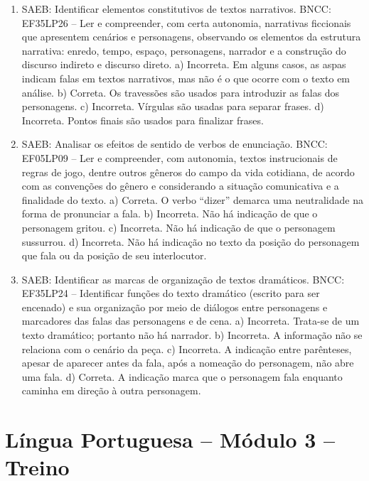 \begin{enumerate}
\item 
SAEB: Identificar elementos constitutivos de textos narrativos.
BNCC: EF35LP26 – Ler e compreender, com certa autonomia, narrativas ficcionais
que apresentem cenários e personagens, observando os elementos da
estrutura narrativa: enredo, tempo, espaço, personagens, narrador e a
construção do discurso indireto e discurso direto.
a) Incorreta. Em alguns casos, as aspas indicam falas em textos narrativos, mas não é o que ocorre com o texto em análise.
b) Correta. Os travessões são usados para introduzir as falas dos
personagens.
c) Incorreta. Vírgulas são usadas para separar frases.
d) Incorreta. Pontos finais são usados para finalizar frases.

\item
SAEB: Analisar os efeitos de sentido de verbos de enunciação.
BNCC: EF05LP09 – Ler e compreender, com autonomia, textos instrucionais de
regras de jogo, dentre outros gêneros do campo da vida cotidiana, de
acordo com as convenções do gênero e considerando a situação
comunicativa e a finalidade do texto.
a) Correta. O verbo “dizer” demarca uma neutralidade na forma de pronunciar a fala.
b) Incorreta. Não há indicação de que o personagem gritou.
c) Incorreta. Não há indicação de que o personagem sussurrou.
d) Incorreta. Não há indicação no texto da posição do personagem que fala ou da posição de seu interlocutor.


\item
SAEB: Identificar as marcas de organização de textos dramáticos.
BNCC: EF35LP24 – Identificar funções do texto dramático (escrito para ser
encenado) e sua organização por meio de diálogos entre personagens e
marcadores das falas das personagens e de cena.
a) Incorreta. Trata-se de um texto dramático; portanto não há narrador.
b) Incorreta. A informação não se relaciona com o cenário da peça.
c) Incorreta. A indicação entre parênteses, apesar de aparecer antes da fala, após a nomeação do personagem, não abre uma fala.
d) Correta. A indicação marca que o personagem fala enquanto caminha em direção à outra personagem.
\end{enumerate}

\section*{Língua Portuguesa – Módulo 3 – Treino}


